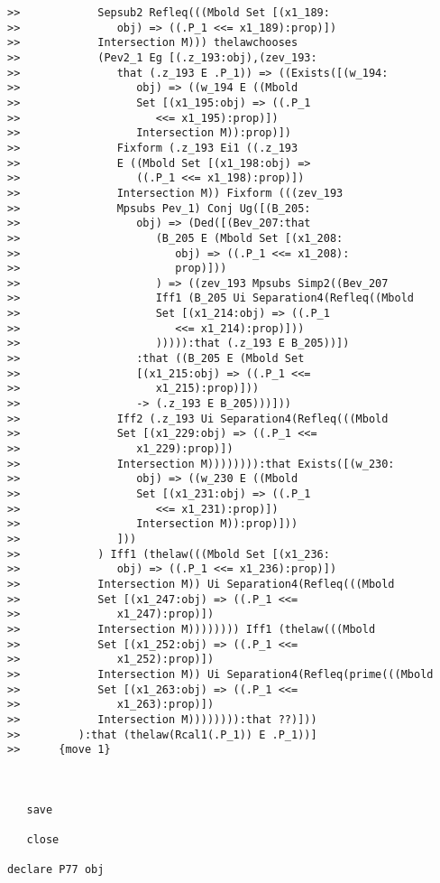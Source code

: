 \documentclass[12pt]{article}
\begin{document}
\begin{verbatim}
>>            Sepsub2 Refleq(((Mbold Set [(x1_189:
>>               obj) => ((.P_1 <<= x1_189):prop)])
>>            Intersection M))) thelawchooses
>>            (Pev2_1 Eg [(.z_193:obj),(zev_193:
>>               that (.z_193 E .P_1)) => ((Exists([(w_194:
>>                  obj) => ((w_194 E ((Mbold
>>                  Set [(x1_195:obj) => ((.P_1
>>                     <<= x1_195):prop)])
>>                  Intersection M)):prop)])
>>               Fixform (.z_193 Ei1 ((.z_193
>>               E ((Mbold Set [(x1_198:obj) =>
>>                  ((.P_1 <<= x1_198):prop)])
>>               Intersection M)) Fixform (((zev_193
>>               Mpsubs Pev_1) Conj Ug([(B_205:
>>                  obj) => (Ded([(Bev_207:that
>>                     (B_205 E (Mbold Set [(x1_208:
>>                        obj) => ((.P_1 <<= x1_208):
>>                        prop)]))
>>                     ) => ((zev_193 Mpsubs Simp2((Bev_207
>>                     Iff1 (B_205 Ui Separation4(Refleq((Mbold
>>                     Set [(x1_214:obj) => ((.P_1
>>                        <<= x1_214):prop)]))
>>                     ))))):that (.z_193 E B_205))])
>>                  :that ((B_205 E (Mbold Set
>>                  [(x1_215:obj) => ((.P_1 <<=
>>                     x1_215):prop)]))
>>                  -> (.z_193 E B_205)))]))
>>               Iff2 (.z_193 Ui Separation4(Refleq(((Mbold
>>               Set [(x1_229:obj) => ((.P_1 <<=
>>                  x1_229):prop)])
>>               Intersection M)))))))):that Exists([(w_230:
>>                  obj) => ((w_230 E ((Mbold
>>                  Set [(x1_231:obj) => ((.P_1
>>                     <<= x1_231):prop)])
>>                  Intersection M)):prop)]))
>>               ]))
>>            ) Iff1 (thelaw(((Mbold Set [(x1_236:
>>               obj) => ((.P_1 <<= x1_236):prop)])
>>            Intersection M)) Ui Separation4(Refleq(((Mbold
>>            Set [(x1_247:obj) => ((.P_1 <<=
>>               x1_247):prop)])
>>            Intersection M)))))))) Iff1 (thelaw(((Mbold
>>            Set [(x1_252:obj) => ((.P_1 <<=
>>               x1_252):prop)])
>>            Intersection M)) Ui Separation4(Refleq(prime(((Mbold
>>            Set [(x1_263:obj) => ((.P_1 <<=
>>               x1_263):prop)])
>>            Intersection M)))))))):that ??)]))
>>         ):that (thelaw(Rcal1(.P_1)) E .P_1))]
>>      {move 1}



   save

   close

declare P77 obj


\end{verbatim}
\end{document}

